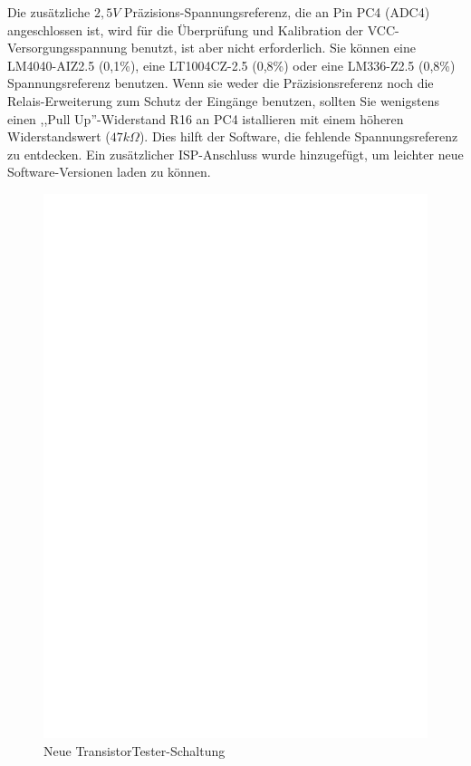 Die zusätzliche \(2,5V\) Präzisions-Spannungsreferenz, die an Pin PC4 (ADC4) angeschlossen ist,
wird für die Überprüfung und Kalibration der VCC-Versorgungsspannung benutzt, ist aber nicht
erforderlich.
Sie können eine LM4040-AIZ2.5 (0,1\%),
eine LT1004CZ-2.5 (0,8\%) oder eine LM336-Z2.5 (0,8\%) Spannungsreferenz benutzen.
Wenn sie weder die Präzisionsreferenz noch die Relais-Erweiterung zum Schutz der Eingänge benutzen,
sollten Sie wenigstens einen ,,Pull Up''-Widerstand R16 an PC4 istallieren mit einem
höheren Widerstandswert (\(47k\Omega\)).
Dies hilft der Software, die fehlende Spannungsreferenz zu entdecken.
Ein zusätzlicher ISP-Anschluss wurde hinzugefügt, um leichter neue Software-Versionen
laden zu können.

\begin{figure}[H]
\centering
\includegraphics[width=18cm]{../FIG/ttester.eps}
\caption{Neue TransistorTester-Schaltung}
\label{fig:ttester}
\end{figure}

